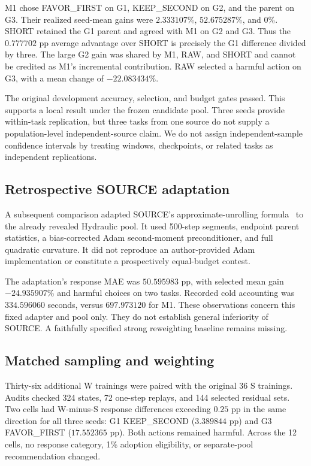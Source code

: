 \documentclass[11pt]{article}
\begin{document}
M1 chose FAVOR\_FIRST on G1, KEEP\_SECOND on G2, and the parent on G3. Their realized seed-mean gains were $2.333107\%$, $52.675287\%$, and $0\%$. SHORT retained the G1 parent and agreed with M1 on G2 and G3. Thus the $0.777702$ pp average advantage over SHORT is precisely the G1 difference divided by three. The large G2 gain was shared by M1, RAW, and SHORT and cannot be credited as M1's incremental contribution. RAW selected a harmful action on G3, with a mean change of $-22.083434\%$.

The original development accuracy, selection, and budget gates passed. This supports a local result under the frozen candidate pool. Three seeds provide within-task replication, but three tasks from one source do not supply a population-level independent-source claim. We do not assign independent-sample confidence intervals by treating windows, checkpoints, or related tasks as independent replications.

\subsection{Retrospective SOURCE adaptation}
A subsequent comparison adapted SOURCE's approximate-unrolling formula~\cite{source} to the already revealed Hydraulic pool. It used 500-step segments, endpoint parent statistics, a bias-corrected Adam second-moment preconditioner, and full quadratic curvature. It did not reproduce an author-provided Adam implementation or constitute a prospectively equal-budget contest.

The adaptation's response MAE was $50.595983$ pp, with selected mean gain $-24.935907\%$ and harmful choices on two tasks. Recorded cold accounting was $334.596060$ seconds, versus $697.973120$ for M1. These observations concern this fixed adapter and pool only. They do not establish general inferiority of SOURCE. A faithfully specified strong reweighting baseline remains missing.

\subsection{Matched sampling and weighting}
Thirty-six additional W trainings were paired with the original 36 S trainings. Audits checked 324 states, 72 one-step replays, and 144 selected residual sets. Two cells had W-minus-S response differences exceeding $0.25$ pp in the same direction for all three seeds: G1 KEEP\_SECOND ($3.389844$ pp) and G3 FAVOR\_FIRST ($17.552365$ pp). Both actions remained harmful. Across the 12 cells, no response category, 1\% adoption eligibility, or separate-pool recommendation changed.
\end{document}
